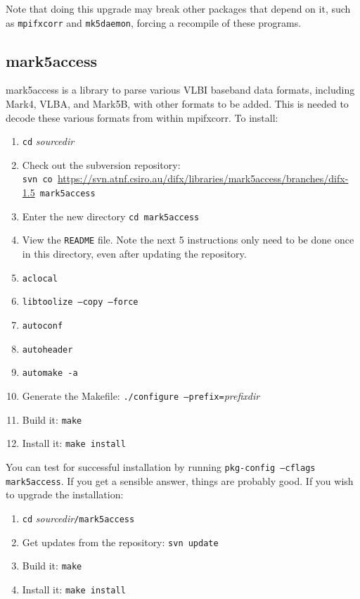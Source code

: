 Note that doing this upgrade may break other packages that depend on it, such as {\tt mpifxcorr} and {\tt mk5daemon}, forcing a recompile of these programs.










\subsection{mark5access} \label{sec:m5a}

mark5access is a library to parse various VLBI baseband data formats, including Mark4, VLBA, and Mark5B, with other formats to be added.
This is needed to decode these various formats from within mpifxcorr.
To install:
\begin{enumerate}
\item {\tt cd} {\em sourcedir}
\item Check out the subversion repository: \\
{\tt svn co }\url{https://svn.atnf.csiro.au/difx/libraries/mark5access/branches/difx-1.5}{\tt\ mark5access}
\item Enter the new directory {\tt cd mark5access}
\item View the {\tt README} file.  
Note the next 5 instructions only need to be done once in this directory, even after updating the repository.
\item {\tt aclocal}  
\item {\tt libtoolize --copy --force}
\item {\tt autoconf}
\item {\tt autoheader}
\item {\tt automake -a} 
\item Generate the Makefile: {\tt ./configure --prefix=}{\em prefixdir}
\item Build it: {\tt make}
\item Install it: {\tt make install}
\end{enumerate}

You can test for successful installation by running {\tt pkg-config --cflags mark5access}.  
If you get a sensible answer, things are probably good.
If you wish to upgrade the installation:
\begin{enumerate}
\item {\tt cd} {\em sourcedir}{\tt /mark5access}
\item Get updates from the repository: {\tt svn update}
\item Build it: {\tt make}
\item Install it: {\tt make install}
\end{enumerate}


